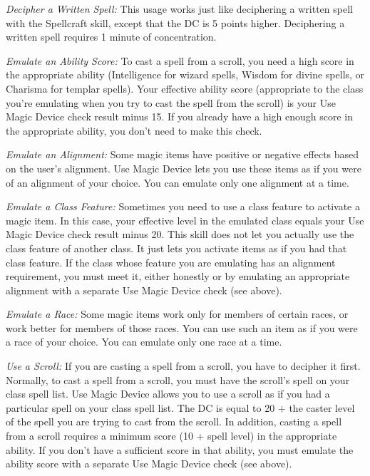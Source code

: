 \textit{Decipher a Written Spell:} This usage works just like deciphering a written spell with the Spellcraft skill, except that the DC is 5 points higher. Deciphering a written spell requires 1 minute of concentration.

\textit{Emulate an Ability Score:} To cast a spell from a scroll, you need a high score in the appropriate ability (Intelligence for wizard spells, Wisdom for divine spells, or Charisma for templar spells). Your effective ability score (appropriate to the class you're emulating when you try to cast the spell from the scroll) is your Use Magic Device check result minus 15. If you already have a high enough score in the appropriate ability, you don't need to make this check.

\textit{Emulate an Alignment:} Some magic items have positive or negative effects based on the user's alignment. Use Magic Device lets you use these items as if you were of an alignment of your choice. You can emulate only one alignment at a time.

\textit{Emulate a Class Feature:} Sometimes you need to use a class feature to activate a magic item. In this case, your effective level in the emulated class equals your Use Magic Device check result minus 20. This skill does not let you actually use the class feature of another class. It just lets you activate items as if you had that class feature. If the class whose feature you are emulating has an alignment requirement, you must meet it, either honestly or by emulating an appropriate alignment with a separate Use Magic Device check (see above).

\textit{Emulate a Race:} Some magic items work only for members of certain races, or work better for members of those races. You can use such an item as if you were a race of your choice. You can emulate only one race at a time.

\textit{Use a Scroll:} If you are casting a spell from a scroll, you have to decipher it first. Normally, to cast a spell from a scroll, you must have the scroll's spell on your class spell list. Use Magic Device allows you to use a scroll as if you had a particular spell on your class spell list. The DC is equal to 20 + the caster level of the spell you are trying to cast from the scroll. In addition, casting a spell from a scroll requires a minimum score (10 + spell level) in the appropriate ability. If you don't have a sufficient score in that ability, you must emulate the ability score with a separate Use Magic Device check (see above).

